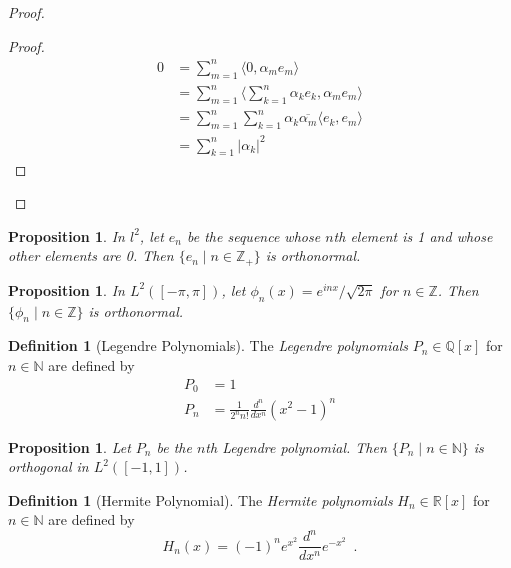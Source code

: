 \documentclass{book}
\let\qed\relax
\newtheorem{prop}[ax]{Proposition}
\theoremstyle{definition}
\newtheorem{df}[ax]{Definition}
\begin{document}
\begin{proof}
\pf
{}
\begin{proof}
	\pf
	\begin{align*}
		0 & = \sum_{m=1}^n \langle 0, \alpha_m e_m \rangle \\
		& = \sum_{m=1}^n \langle \sum_{k=1}^n \alpha_k e_k, \alpha_m e_m \rangle \\
		& = \sum_{m=1}^n \sum_{k=1}^n \alpha_k \overline{\alpha_m} \langle e_k, e_m \rangle \\
		& = \sum_{k=1}^n |\alpha_k|^2
	\end{align*}
\end{proof}
\qed
\end{proof}

\begin{prop}
In $l^2$, let $e_n$ be the sequence whose $n$th element is 1 and whose other elements are 0. Then $\{ e_n \mid n \in \mathbb{Z}_+ \}$ is orthonormal.
\end{prop}

\begin{prop}
In $L^2([-\pi,\pi])$, let $\phi_n(x) = e^{inx}/\sqrt{2\pi}$ for $n \in \mathbb{Z}$. Then $\{ \phi_n \mid n \in \mathbb{Z} \}$ is orthonormal.
\end{prop}

\begin{df}[Legendre Polynomials]
The \emph{Legendre polynomials} $P_n \in \mathbb{Q}[x]$ for $n \in \mathbb{N}$ are defined by
\begin{align*}
P_0 & = 1 \\
P_n & = \frac{1}{2^n n!} \frac{d^n}{dx^n} (x^2-1)^n
\end{align*}
\end{df}

\begin{prop}
Let $P_n$ be the $n$th Legendre polynomial. Then $\{ P_n \mid n \in \mathbb{N} \}$ is orthogonal in $L^2([-1,1])$.
\end{prop}

\begin{df}[Hermite Polynomial]
The \emph{Hermite polynomials} $H_n \in \mathbb{R}[x]$ for $n \in \mathbb{N}$ are defined by
\[ H_n(x) = (-1)^n e^{x^2} \frac{d^n}{dx^n} e^{-x^2} \enspace . \]
\end{df}
\end{document}
